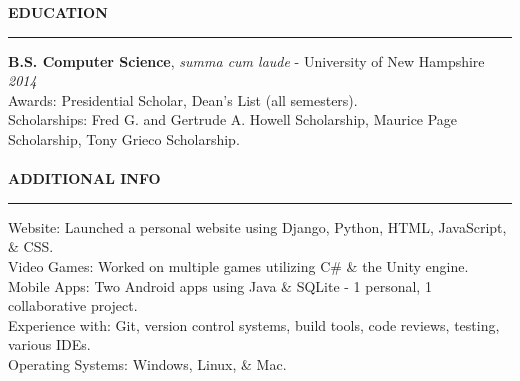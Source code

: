 \documentclass[a4paper,10pt]{article}
\begin{document}
\noindent
\textbf{EDUCATION}
\vspace{5pt}
\hrule
\vspace{3pt}
\noindent\textbf{B.S. Computer Science}, \textit{summa cum laude} - University of New Hampshire
\hfill
\textit{2014}\\
Awards:
\indent
Presidential Scholar, Dean’s List (all semesters).\\
Scholarships:
\indent
Fred G. and Gertrude A. Howell Scholarship, Maurice Page Scholarship, Tony Grieco Scholarship.\\
\\

\noindent
\textbf{ADDITIONAL INFO}
\vspace{5pt}
\hrule
\vspace{3pt}
\noindent
Website:
\indent
Launched a personal website using Django, Python, HTML, JavaScript, \& CSS.\\
Video Games:
\indent
Worked on multiple games utilizing C\# \& the Unity engine.\\
Mobile Apps:
\indent
Two Android apps using Java \& SQLite - 1 personal, 1 collaborative project.\\
Experience with:
\indent
Git, version control systems, build tools, code reviews, testing, various IDEs.\\
Operating Systems:
\indent
Windows, Linux, \& Mac.\\
\end{document}
